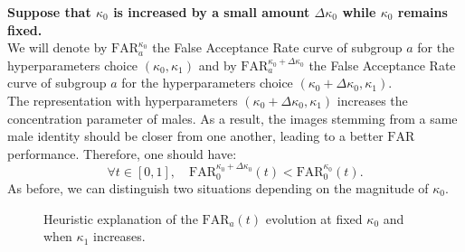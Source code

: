 \documentclass[nohyperref]{article}
\theoremstyle{plain}
\theoremstyle{definition}
\theoremstyle{remark}
\begin{document}
{\bf Suppose that $\kappa_0$ is increased by a small amount $\Delta \kappa_0$ while $\kappa_0$ remains fixed.}\\
We will denote by $\mathrm{FAR}_a^{\kappa_0}$ the False Acceptance Rate curve of subgroup $a$ for the hyperparameters choice $(\kappa_0, \kappa_1)$ and by $\mathrm{FAR}_a^{\kappa_0 + \Delta \kappa_0}$ the False Acceptance Rate curve of subgroup $a$ for the hyperparameters choice $(\kappa_0 + \Delta \kappa_0, \kappa_1 )$.\\
The representation with hyperparameters $(\kappa_0 + \Delta \kappa_0, \kappa_1 )$ increases the concentration parameter of males. As a result, the images stemming from a same male identity should be closer from one another, leading to a better $\mathrm{FAR}$ performance. Therefore, one should have:
\begin{equation} \label{eq:far_1_kappa_0}
\forall t \in [0,1], \quad \mathrm{FAR}_0^{\kappa_0 + \Delta \kappa_0}(t) < \mathrm{FAR}_0^{\kappa_0}(t). 
\end{equation}
As before, we can distinguish two situations depending on the magnitude of $\kappa_0$.



\begin{figure}[h]
    \centering
    
     \hspace{0.2cm}


    
\caption{Heuristic explanation of the $\mathrm{FAR}_a(t)$ evolution at fixed $\kappa_0$ and when $\kappa_1$ increases.}    \label{fig:hyperparam_farbis}
\end{figure}
\end{document}
